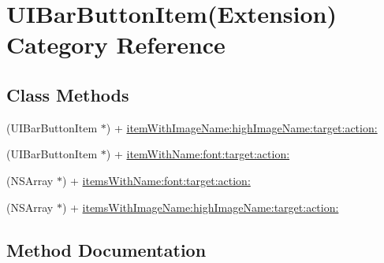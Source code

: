\hypertarget{category_u_i_bar_button_item_07_extension_08}{}\section{U\+I\+Bar\+Button\+Item(Extension) Category Reference}
\label{category_u_i_bar_button_item_07_extension_08}
\subsection*{Class Methods}
\begin{DoxyCompactItemize}
\item 
(U\+I\+Bar\+Button\+Item $\ast$) + \mbox{\hyperlink{category_u_i_bar_button_item_07_extension_08_afae7a98150fc15c4d8b2312dc66cfc78}{item\+With\+Image\+Name\+:high\+Image\+Name\+:target\+:action\+:}}
\item 
(U\+I\+Bar\+Button\+Item $\ast$) + \mbox{\hyperlink{category_u_i_bar_button_item_07_extension_08_ab8eb72d80e7b0a1eb6c6a603180c1829}{item\+With\+Name\+:font\+:target\+:action\+:}}
\item 
(N\+S\+Array $\ast$) + \mbox{\hyperlink{category_u_i_bar_button_item_07_extension_08_a85929b04a4df88bd86c9db2f9440b422}{items\+With\+Name\+:font\+:target\+:action\+:}}
\item 
(N\+S\+Array $\ast$) + \mbox{\hyperlink{category_u_i_bar_button_item_07_extension_08_aa53ee1796bc9df4034f6a31e593f568d}{items\+With\+Image\+Name\+:high\+Image\+Name\+:target\+:action\+:}}
\end{DoxyCompactItemize}


\subsection{Method Documentation}
\mbox{\label{category_u_i_bar_button_item_07_extension_08_aa53ee1796bc9df4034f6a31e593f568d}} 
